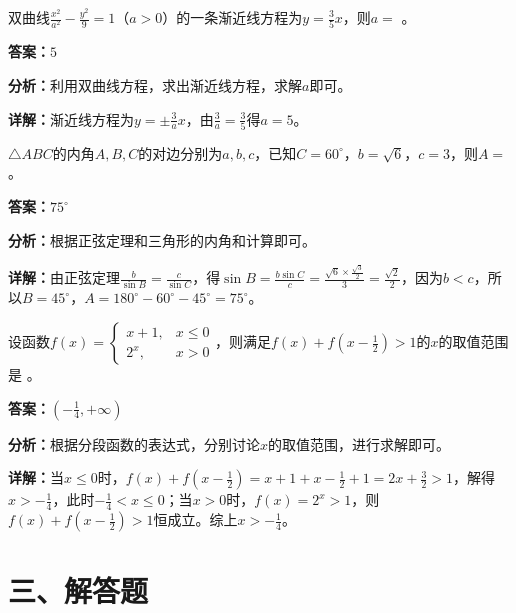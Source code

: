 \begin{question}[points=5]
双曲线$\frac{x^2}{a^2}-\frac{y^2}{9}=1$（$a>0$）的一条渐近线方程为$y=\frac{3}{5}x$，则$a=$              。
\fillin[{$5$}]
\begin{solution}
\textbf{答案：}$5$

\textbf{分析：}利用双曲线方程，求出渐近线方程，求解$a$即可。

\textbf{详解：}渐近线方程为$y=\pm\frac{3}{a}x$，由$\frac{3}{a}=\frac{3}{5}$得$a=5$。
\end{solution}
\end{question}

\begin{question}[points=5]
$\triangle ABC$的内角$A,B,C$的对边分别为$a,b,c$，已知$C=60^\circ$，$b=\sqrt{6}$，$c=3$，则$A=$        。
\fillin[{$75^\circ$}]
\begin{solution}
\textbf{答案：}$75^\circ$

\textbf{分析：}根据正弦定理和三角形的内角和计算即可。

\textbf{详解：}由正弦定理$\frac{b}{\sin B}=\frac{c}{\sin C}$，得$\sin B=\frac{b\sin C}{c}=\frac{\sqrt{6}\times\frac{\sqrt{3}}{2}}{3}=\frac{\sqrt{2}}{2}$，因为$b<c$，所以$B=45^\circ$，$A=180^\circ-60^\circ-45^\circ=75^\circ$。
\end{solution}
\end{question}

\begin{question}[points=5]
设函数$f(x)=\begin{cases} x+1,&x\le 0 \\ 2^x,&x>0 \end{cases}$，则满足$f(x)+f(x-\frac{1}{2})>1$的$x$的取值范围是           。
\begin{solution}
\textbf{答案：}$(-\frac{1}{4},+\infty)$

\textbf{分析：}根据分段函数的表达式，分别讨论$x$的取值范围，进行求解即可。

\textbf{详解：}当$x\le 0$时，$f(x)+f(x-\frac{1}{2})=x+1+x-\frac{1}{2}+1=2x+\frac{3}{2}>1$，解得$x>-\frac{1}{4}$，此时$-\frac{1}{4}<x\le 0$；当$x>0$时，$f(x)=2^x>1$，则$f(x)+f(x-\frac{1}{2})>1$恒成立。综上$x>-\frac{1}{4}$。
\end{solution}
\end{question}

\section*{三、解答题}


